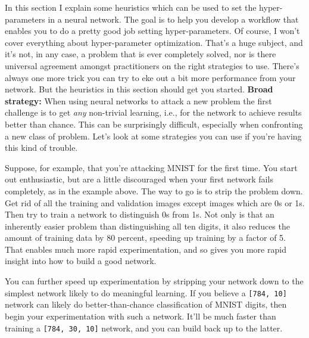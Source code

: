In this section I explain some heuristics which can be used to set the hyper-parameters in a neural network. The goal is to help you develop a workflow that enables you to do a pretty good job setting hyper-parameters. Of course, I won't cover everything about hyper-parameter optimization. That's a huge subject, and it's not, in any case, a problem that is ever completely solved, nor is there universal agreement amongst practitioners on the right strategies to use. There's always one more trick you can try to eke out a bit more performance from your network. But the heuristics in this section should get you started. \textbf{Broad strategy:} When using neural networks to attack a new problem the first challenge is to get \emph{any} non-trivial learning, i.e., for the network to achieve results better than chance. This can be surprisingly difficult, especially when confronting a new class of problem. Let's look at some strategies you can use if you're having this kind of trouble.


Suppose, for example, that you're attacking MNIST for the first time. You start out enthusiastic, but are a little discouraged when your first network fails completely, as in the example above. The way to go is to strip the problem down. Get rid of all the training and validation images except images which are 0s or 1s. Then try to train a network to distinguish 0s from 1s. Not only is that an inherently easier problem than distinguishing all ten digits, it also reduces the amount of training data by 80 percent, speeding up training by a factor of 5. That enables much more rapid experimentation, and so gives you more rapid insight into how to build a good network.


You can further speed up experimentation by stripping your network down to the simplest network likely to do meaningful learning. If you believe a \texttt{[784, 10]} network can likely do better-than-chance classification of MNIST digits, then begin your experimentation with such a network. It'll be much faster than training a \texttt{[784, 30, 10]} network, and you can build back up to the latter.


